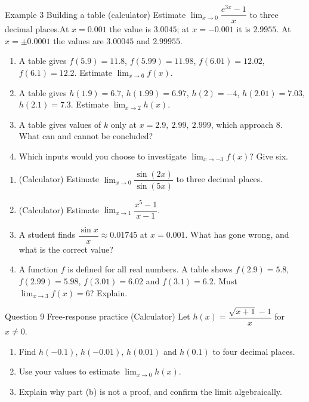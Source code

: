 \documentclass[11pt]{article}
\begin{document}
\begin{example}{Example 3 \textperiodcentered{} Building a table (calculator)}
Estimate $\displaystyle\lim_{x\to 0}\dfrac{e^{3x}-1}{x}$ to three decimal places.\soln At $x=0.001$ the value is $3.0045$; at $x=-0.001$ it is $2.9955$. At $x=\pm0.0001$ the values are $3.00045$ and $2.99955$.
\end{example}

\newpage
{}

\begin{enumerate}[leftmargin=*,itemsep=2pt]
  \item A table gives $f(5.9)=11.8$, $f(5.99)=11.98$, $f(6.01)=12.02$, $f(6.1)=12.2$. Estimate $\displaystyle\lim_{x\to 6}f(x)$.\work{2.3cm}
  \item A table gives $h(1.9)=6.7$, $h(1.99)=6.97$, $h(2)=-4$, $h(2.01)=7.03$, $h(2.1)=7.3$. Estimate $\displaystyle\lim_{x\to 2}h(x)$.\work{2.3cm}
  \item A table gives values of $k$ only at $x=2.9,\ 2.99,\ 2.999$, which approach 8. What can and cannot be concluded?\work{2.3cm}
  \item Which inputs would you choose to investigate $\displaystyle\lim_{x\to -3}f(x)$? Give six.\work{2.3cm}
\end{enumerate}

\begin{enumerate}[leftmargin=*,itemsep=2pt,start=5]
  \item (Calculator) Estimate $\displaystyle\lim_{x\to 0}\dfrac{\sin(2x)}{\sin(5x)}$ to three decimal places.\work{2.8cm}
  \item (Calculator) Estimate $\displaystyle\lim_{x\to 1}\dfrac{x^5-1}{x-1}$.\work{2.8cm}
  \item A student finds $\dfrac{\sin x}{x}\approx0.01745$ at $x=0.001$. What has gone wrong, and what is the correct value?\work{2.8cm}
  \item A function $f$ is defined for all real numbers. A table shows $f(2.9)=5.8$, $f(2.99)=5.98$, $f(3.01)=6.02$ and $f(3.1)=6.2$. Must $\displaystyle\lim_{x\to 3}f(x)=6$? Explain.\work{2.8cm}
\end{enumerate}

\begin{frbox}{Question 9 \textperiodcentered{} Free-response practice}
(Calculator) Let $h(x)=\dfrac{\sqrt{x+1}-1}{x}$ for $x\neq0$.
\begin{enumerate}[label=(\alph*),leftmargin=*,itemsep=2pt]
  \item Find $h(-0.1)$, $h(-0.01)$, $h(0.01)$ and $h(0.1)$ to four decimal places.\work{2.6cm}
  \item Use your values to estimate $\displaystyle\lim_{x\to 0}h(x)$.\work{2.6cm}
  \item Explain why part (b) is not a proof, and confirm the limit algebraically.\work{2.6cm}
\end{enumerate}
\end{frbox}
\end{document}
